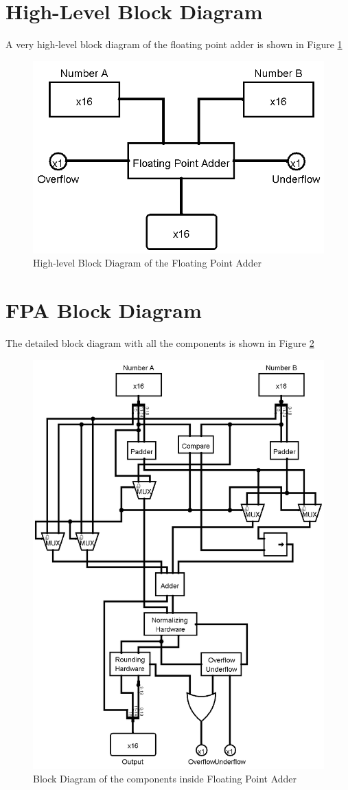\documentclass[12pt, a4paper]{article}
\begin{document}
	\section{High-Level Block Diagram}
	A very high-level block diagram of the floating point adder is shown in Figure \ref{fig2}
	\begin{figure}[h!]
		\centering
		\includegraphics[width = 0.7\linewidth]{block_diagram}
		\caption{High-level Block Diagram of the Floating Point Adder}
		\label{fig2}
	\end{figure}
	\newpage
	\section{FPA Block Diagram}
	The detailed block diagram with all the components is shown in Figure \ref{fig3}
	\begin{figure}[h!]
		\centering
		\includegraphics[scale = 0.35]{fpa}
		\caption{Block Diagram of the components inside Floating Point Adder}
		\label{fig3}
	\end{figure}
	\newpage
\end{document}
